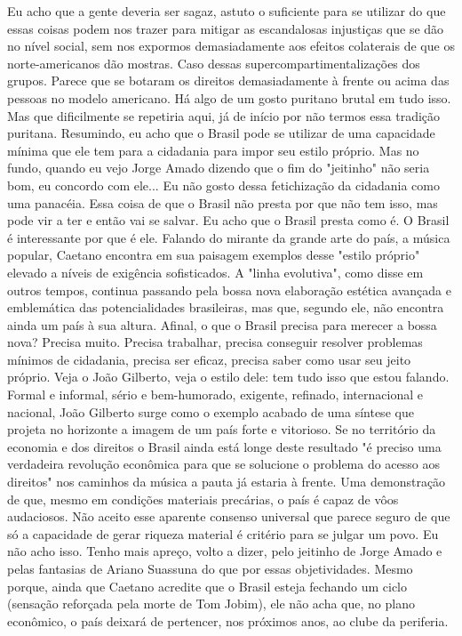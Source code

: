 Eu acho que a gente deveria ser sagaz, astuto o suficiente para se utilizar do que essas coisas podem nos trazer para mitigar as escandalosas injustiças que se dão no nível social, sem nos expormos demasiadamente aos efeitos colaterais de que os norte-americanos dão mostras. Caso dessas supercompartimentalizações dos grupos. Parece que se botaram os direitos demasiadamente à frente ou acima das pessoas no modelo americano. Há algo de um gosto puritano brutal em tudo isso. Mas que dificilmente se repetiria aqui, já de início por não termos essa tradição puritana.
Resumindo, eu acho que o Brasil pode se utilizar de uma capacidade mínima que ele tem para a cidadania para impor seu estilo próprio. Mas no fundo, quando eu vejo Jorge Amado dizendo que o fim do "jeitinho" não seria bom, eu concordo com ele... Eu não gosto dessa fetichização da cidadania como uma panacéia. Essa coisa de que o Brasil não presta por que não tem isso, mas pode vir a ter e então vai se salvar. Eu acho que o Brasil presta como é. O Brasil é interessante por que é ele.
Falando do mirante da grande arte do país, a música popular, Caetano encontra em sua paisagem exemplos desse "estilo próprio" elevado a níveis de exigência sofisticados. A "linha evolutiva", como disse em outros tempos, continua passando pela bossa nova elaboração estética avançada e emblemática das potencialidades brasileiras, mas que, segundo ele, não encontra ainda um país à sua altura.
Afinal, o que o Brasil precisa para merecer a bossa nova?
Precisa muito. Precisa trabalhar, precisa conseguir resolver problemas mínimos de cidadania, precisa ser eficaz, precisa saber como usar seu jeito próprio. Veja o João Gilberto, veja o estilo dele: tem tudo isso que estou falando.
Formal e informal, sério e bem-humorado, exigente, refinado, internacional e nacional, João Gilberto surge como o exemplo acabado de uma síntese que projeta no horizonte a imagem de um país forte e vitorioso. Se no território da economia e dos direitos o Brasil ainda está longe deste resultado "é preciso uma verdadeira revolução econômica para que se solucione o problema do acesso aos direitos" nos caminhos da música a pauta já estaria à frente.
Uma demonstração de que, mesmo em condições materiais precárias, o país é capaz de vôos audaciosos.
Não aceito esse aparente consenso universal que parece seguro de que só a capacidade de gerar riqueza material é critério para se julgar um povo. Eu não acho isso. Tenho mais apreço, volto a dizer, pelo jeitinho de Jorge Amado e pelas fantasias de Ariano Suassuna do que por essas objetividades.
Mesmo porque, ainda que Caetano acredite que o Brasil esteja fechando um ciclo (sensação reforçada pela morte de Tom Jobim), ele não acha que, no plano econômico, o país deixará de pertencer, nos próximos anos, ao clube da periferia.
